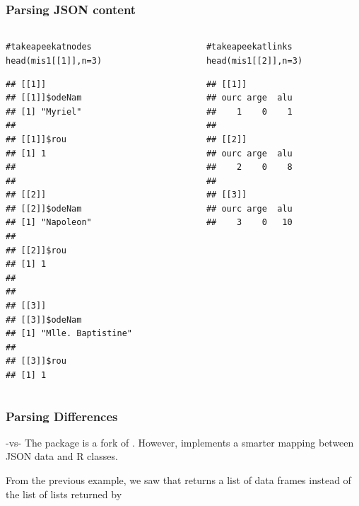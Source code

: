 \documentclass{beamer}\usepackage[]{graphicx}\usepackage[]{color}
\makeatletter
\newcommand{\hlnum}[1]{\textcolor[rgb]{0.063,0.58,0.627}{#1}}%
\newcommand{\hlcom}[1]{\textcolor[rgb]{0.588,0.588,0.588}{#1}}%
\newcommand{\hlstd}[1]{\textcolor[rgb]{0.196,0.196,0.196}{#1}}%
\newcommand{\hlkwc}[1]{\textcolor[rgb]{0,0.631,0.314}{#1}}%
\newcommand{\hlkwd}[1]{\textcolor[rgb]{0.78,0.227,0.412}{#1}}%
\newenvironment{kframe}{%
 \def\at@end@of@kframe{}%
 \ifinner\ifhmode%
  \def\at@end@of@kframe{\end{minipage}}%
  \begin{minipage}{\columnwidth}%
 \fi\fi%
 \def\FrameCommand##1{\hskip\@totalleftmargin \hskip-\fboxsep
 \colorbox{shadecolor}{##1}\hskip-\fboxsep
     \hskip-\linewidth \hskip-\@totalleftmargin \hskip\columnwidth}%
 \MakeFramed {\advance\hsize-\width
   \@totalleftmargin\z@ \linewidth\hsize
   \@setminipage}}%
 {\par\unskip\endMakeFramed%
 \at@end@of@kframe}
\newenvironment{knitrout}{}{} %
\makeatother
\begin{document}

\begin{frame}[fragile]
\frametitle{Parsing JSON content}

\begin{columns}[t]
\begin{column}{0.5\textwidth}
\begin{knitrout}\tiny
{}\color{fgcolor}\begin{kframe}
\begin{alltt}
\hlcom{# take a peek at nodes}
\hlkwd{head}\hlstd{(mis1[[}\hlnum{1}\hlstd{]],} \hlkwc{n} \hlstd{=} \hlnum{3}\hlstd{)}
\end{alltt}
\begin{verbatim}
## [[1]]
## [[1]]$odeNam
## [1] "Myriel"
## 
## [[1]]$rou
## [1] 1
## 
## 
## [[2]]
## [[2]]$odeNam
## [1] "Napoleon"
## 
## [[2]]$rou
## [1] 1
## 
## 
## [[3]]
## [[3]]$odeNam
## [1] "Mlle. Baptistine"
## 
## [[3]]$rou
## [1] 1
\end{verbatim}
\end{kframe}
\end{knitrout}
\end{column}

\begin{column}{0.5\textwidth}
\begin{knitrout}\tiny
{}\color{fgcolor}\begin{kframe}
\begin{alltt}
\hlcom{# take a peek at links}
\hlkwd{head}\hlstd{(mis1[[}\hlnum{2}\hlstd{]],} \hlkwc{n} \hlstd{=} \hlnum{3}\hlstd{)}
\end{alltt}
\begin{verbatim}
## [[1]]
## ourc arge  alu 
##    1    0    1 
## 
## [[2]]
## ourc arge  alu 
##    2    0    8 
## 
## [[3]]
## ourc arge  alu 
##    3    0   10
\end{verbatim}
\end{kframe}
\end{knitrout}
\end{column}
\end{columns}

\end{frame}


\begin{frame}[fragile]
\frametitle{Parsing Differences}

\begin{block}{ -vs- }
The package  is a fork of . However,  implements a smarter mapping between JSON data and R classes.

\bigskip
From the previous example, we saw that  returns a list of data frames instead of the list of lists returned by 
\end{block}

\end{frame}

\end{document}
